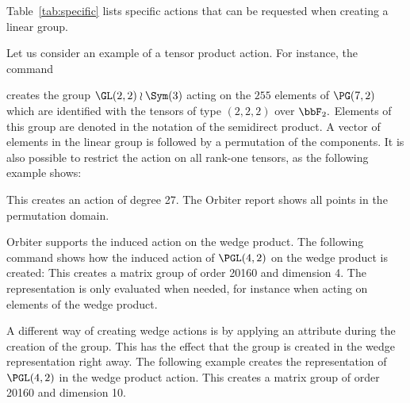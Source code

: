 Table~\ref{tab:specific} lists specific actions 
that can be requested when creating a linear group.


Let us consider an example of a tensor product action.
For instance, the command 


creates the group $\GL(2,2) \wr \Sym(3)$ acting on the $255$ elements 
of $\PG(7,2)$ which are identified with the 
tensors of type $(2,2,2)$ over $\bbF_2.$  
Elements of this group are denoted in the notation 
of the semidirect product. 
A vector of elements in the linear group 
is followed by a permutation of the components. 
It is also possible to restrict the action on all rank-one tensors, 
as the following example shows:


This creates an action of degree 27. 
The Orbiter report shows all points in the permutation domain.


\bigskip




Orbiter supports the induced action on the wedge product. 
The following command shows how the induced action of $\PGL(4,2)$ 
on the wedge product is created:
This creates a matrix group of order 20160 and dimension 4.
The representation is only evaluated when needed, for instance when 
acting on elements of the wedge product.

\bigskip

A different way of creating wedge actions is by applying an attribute during the creation of the group. 
This has the effect that the group is created in the wedge representation right away. 
The following example creates the representation of $\PGL(4,2)$ in the wedge product action.
This creates a matrix group of order 20160 and dimension 10.

